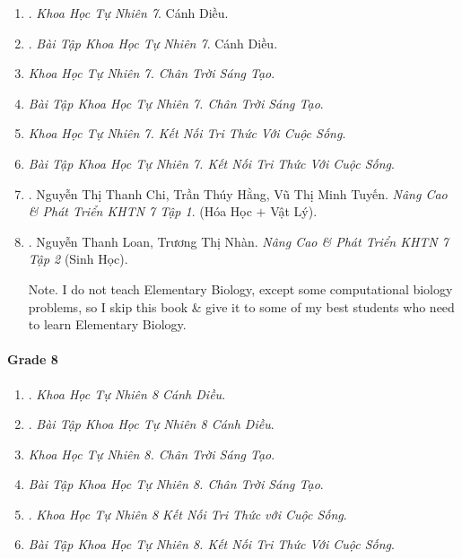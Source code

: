 \documentclass{article}
\begin{document}
\begin{enumerate}
	\item \cite{SGK_KHTN_7_CD}. {\it Khoa Học Tự Nhiên 7}. Cánh Diều.\hfill{\sf[done]}

	\item \cite{SBT_KHTN_7_CD}. {\it Bài Tập  Khoa Học Tự Nhiên 7}. Cánh Diều.\hfill{\sf[done]}

	\item {\it Khoa Học Tự Nhiên 7. Chân Trời Sáng Tạo}.

	\item {\it Bài Tập Khoa Học Tự Nhiên 7. Chân Trời Sáng Tạo}.

	\item {\it Khoa Học Tự Nhiên 7. Kết Nối Tri Thức Với Cuộc Sống}.

	\item {\it Bài Tập Khoa Học Tự Nhiên 7. Kết Nối Tri Thức Với Cuộc Sống}.

	\item \cite{ncpt_KHTN_7_tap_1}. Nguyễn Thị Thanh Chi, Trần Thúy Hằng, Vũ Thị Minh Tuyến. {\it Nâng Cao \& Phát Triển KHTN 7 Tập 1}. (Hóa Học $+$ Vật Lý).\hfill{\sf[done]}

	\item \cite{ncpt_KHTN_7_tap_2}. Nguyễn Thanh Loan, Trương Thị Nhàn. {\it Nâng Cao \& Phát Triển KHTN 7 Tập 2} (Sinh Học).\hfill{\sf[done]}

	{\sf Note.} I do not teach Elementary Biology, except some computational biology problems, so I skip this book \& give it to some of my best students who need to learn Elementary Biology.
\end{enumerate}

\paragraph{Grade 8}

\begin{enumerate}
	\item \cite{SGK_KHTN_8_CD}. {\it Khoa Học Tự Nhiên 8 Cánh Diều}.\hfill{\sf[done]}

	\item \cite{SBT_KHTN_8_CD}. {\it Bài Tập Khoa Học Tự Nhiên 8 Cánh Diều}.\hfill{\sf[done]}

	\item {\it Khoa Học Tự Nhiên 8. Chân Trời Sáng Tạo}.

	\item {\it Bài Tập Khoa Học Tự Nhiên 8. Chân Trời Sáng Tạo}.

	\item \cite{SGK_KHTN_8_KNTTVCS}. {\it Khoa Học Tự Nhiên 8 Kết Nối Tri Thức với Cuộc Sống}.\hfill{\sf[done]}

	\item {\it Bài Tập Khoa Học Tự Nhiên 8. Kết Nối Tri Thức Với Cuộc Sống}.
\end{enumerate}
\end{document}

